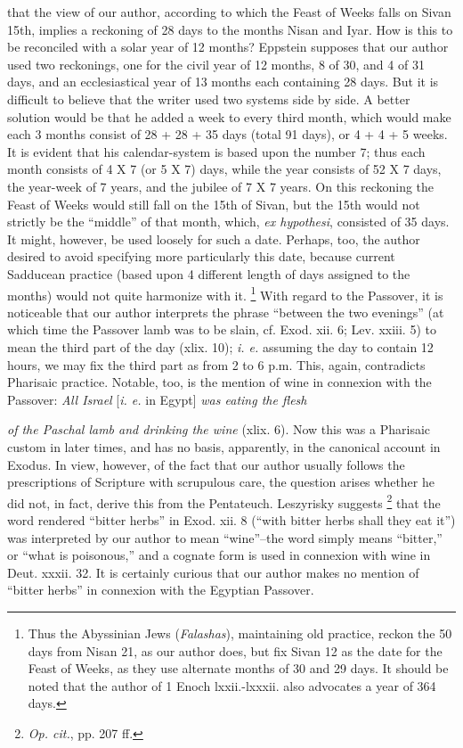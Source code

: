 that the view of our author, according to which the Feast of Weeks falls on Sivan 15th, implies a reckoning of 28 days to the months Nisan and Iyar. How is this to be reconciled with a solar year of 12 months? Eppstein supposes that our author used two reckonings, one for the civil year of 12 months, 8 of 30, and 4 of 31 days, and an ecclesiastical year of 13 months each containing 28 days. But it is difficult to believe that the writer used two systems side by side. A better solution would be that he added a week to every third month, which would make each 3 months consist of 28 + 28 + 35 days (total 91 days), or 4 + 4 + 5 weeks. It is evident that his calendar-system is based upon the number 7; thus each month consists of 4 X 7 (or 5 X 7) days, while the year consists of 52 X 7 days, the year-week of 7 years, and the jubilee of 7 X 7 years. On this reckoning the Feast of Weeks would still fall on the 15th of Sivan, but the 15th would not strictly be the ``middle'' of that month, which, \emph{ex hypothesi}, consisted of 35 days. It might, however, be used loosely for such a date. Perhaps, too, the author desired to avoid specifying more particularly this date, because current Sadducean practice (based upon 4 different length of days assigned to the months) would not quite harmonize with it. \footnote{Thus the Abyssinian Jews (\emph{Falashas}), maintaining old practice, reckon the 50 days from Nisan 21, as our author does, but fix Sivan 12 as the date for the Feast of Weeks, as they use alternate months of 30 and 29 days. It should be noted that the author of 1 Enoch lxxii.-lxxxii. also advocates a year of 364 days.} With regard to the Passover, it is noticeable that our author interprets the phrase ``between the two evenings'' (at which time the Passover lamb was to be slain, cf. Exod. xii. 6; Lev. xxiii. 5) to mean the third part of the day (xlix. 10); \emph{i. e.} assuming the day to contain 12 hours, we may fix the third part as from 2 to 6 p.m. This, again, contradicts Pharisaic practice. Notable, too, is the mention of wine in connexion with the Passover: \emph{All Israel} [\emph{i. e.} in Egypt] \emph{was eating the flesh}

\emph{of the Paschal lamb and drinking the wine} (xlix. 6). Now this was a Pharisaic custom in later times, and has no basis, apparently, in the canonical account in Exodus. In view, however, of the fact that our author usually follows the prescriptions of Scripture with scrupulous care, the question arises whether he did not, in fact, derive this from the Pentateuch. Leszyrisky suggests \footnote{\emph{Op. cit.}, pp. 207 ff.} that the word rendered ``bitter herbs'' in Exod. xii. 8 (``with bitter herbs shall they eat it'') was interpreted by our author to mean ``wine''--the word simply means ``bitter,'' or ``what is poisonous,'' and a cognate form is used in connexion with wine in Deut. xxxii. 32. It is certainly curious that our author makes no mention of ``bitter herbs'' in connexion with the Egyptian Passover.

